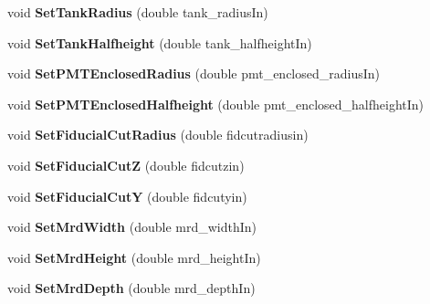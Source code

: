 \begin{DoxyCompactItemize}
\item 
\hypertarget{classGeometry_a0f2d050fa42af21e6e0b4914974b45f5}{
void {\bfseries SetTankRadius} (double tank\_\-radiusIn)}
\label{classGeometry_a0f2d050fa42af21e6e0b4914974b45f5}

\item 
\hypertarget{classGeometry_aae1817255945967705d105665b2fb248}{
void {\bfseries SetTankHalfheight} (double tank\_\-halfheightIn)}
\label{classGeometry_aae1817255945967705d105665b2fb248}

\item 
\hypertarget{classGeometry_a220d86cc649f42a16d33c73c1fc9e70e}{
void {\bfseries SetPMTEnclosedRadius} (double pmt\_\-enclosed\_\-radiusIn)}
\label{classGeometry_a220d86cc649f42a16d33c73c1fc9e70e}

\item 
\hypertarget{classGeometry_aca093a4eaad96fa51b4bac6fbe5fc5b6}{
void {\bfseries SetPMTEnclosedHalfheight} (double pmt\_\-enclosed\_\-halfheightIn)}
\label{classGeometry_aca093a4eaad96fa51b4bac6fbe5fc5b6}

\item 
\hypertarget{classGeometry_a88cbe634b7185c5230f925a182599dd1}{
void {\bfseries SetFiducialCutRadius} (double fidcutradiusin)}
\label{classGeometry_a88cbe634b7185c5230f925a182599dd1}

\item 
\hypertarget{classGeometry_acddde32956d96095d3deb2d00c90a3ee}{
void {\bfseries SetFiducialCutZ} (double fidcutzin)}
\label{classGeometry_acddde32956d96095d3deb2d00c90a3ee}

\item 
\hypertarget{classGeometry_a808167f759b49e7958abe1598d6b6294}{
void {\bfseries SetFiducialCutY} (double fidcutyin)}
\label{classGeometry_a808167f759b49e7958abe1598d6b6294}

\item 
\hypertarget{classGeometry_a120524e0dcd97fdea137b49b976a5183}{
void {\bfseries SetMrdWidth} (double mrd\_\-widthIn)}
\label{classGeometry_a120524e0dcd97fdea137b49b976a5183}

\item 
\hypertarget{classGeometry_a42377661ec147b299c500e9aa49aaf54}{
void {\bfseries SetMrdHeight} (double mrd\_\-heightIn)}
\label{classGeometry_a42377661ec147b299c500e9aa49aaf54}

\item 
\hypertarget{classGeometry_a44da646292c6c7e83709e8aa47236844}{
void {\bfseries SetMrdDepth} (double mrd\_\-depthIn)}
\label{classGeometry_a44da646292c6c7e83709e8aa47236844}


\end{DoxyCompactItemize}
